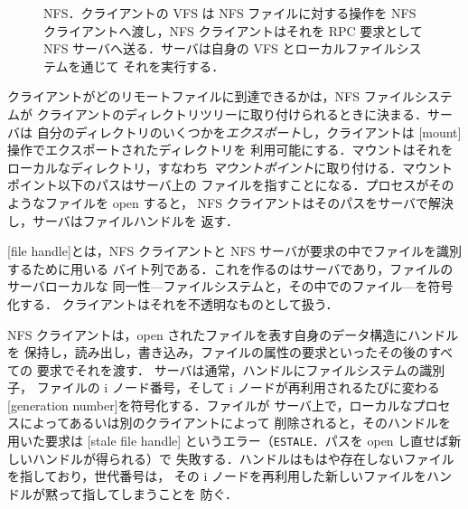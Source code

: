 \documentclass[../main.tex]{subfiles}
\begin{document}
\begin{figure}[htbp]
  \centering
  
  \caption{NFS．クライアントの VFS は NFS ファイルに対する操作を NFS
    クライアントへ渡し，NFS クライアントはそれを RPC 要求として NFS
    サーバへ送る．サーバは自身の VFS とローカルファイルシステムを通じて
    それを実行する．}
  \label{fig:l14-nfs}
\end{figure}

クライアントがどのリモートファイルに到達できるかは，NFS ファイルシステムが
クライアントのディレクトリツリーに取り付けられるときに決まる．サーバは
自分のディレクトリのいくつかを\emph{エクスポート}し，クライアントは
[mount]操作でエクスポートされたディレクトリを
利用可能にする．マウントはそれをローカルなディレクトリ，すなわち
\emph{マウントポイント}に取り付ける．マウントポイント以下のパスはサーバ上の
ファイルを指すことになる．プロセスがそのようなファイルを open すると，
NFS クライアントはそのパスをサーバで解決し，サーバはファイルハンドルを
返す．

\begin{definition}[ファイルハンドル]
  [file handle]とは，NFS
  クライアントと NFS サーバが要求の中でファイルを識別するために用いる
  バイト列である．これを作るのはサーバであり，ファイルのサーバローカルな
  同一性---ファイルシステムと，その中でのファイル---を符号化する．
  クライアントはそれを不透明なものとして扱う．
\end{definition}

NFS クライアントは，open されたファイルを表す自身のデータ構造にハンドルを
保持し，読み出し，書き込み，ファイルの属性の要求といったその後のすべての
要求でそれを渡す．
サーバは通常，ハンドルにファイルシステムの識別子，
ファイルの i ノード番号，そして i ノードが再利用されるたびに変わる
[generation number]を符号化する．ファイルが
サーバ上で，ローカルなプロセスによってあるいは別のクライアントによって
削除されると，そのハンドルを用いた要求は
[stale file handle]%
というエラー（\texttt{ESTALE}．パスを open し直せば新しいハンドルが得られる）で
失敗する．ハンドルはもはや存在しないファイルを指しており，世代番号は，
その i ノードを再利用した新しいファイルをハンドルが黙って指してしまうことを
防ぐ．
\end{document}
